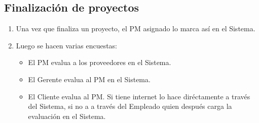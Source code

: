 \subsection{Finalización de proyectos}
\begin{enumerate}
    \item Una vez que finaliza un proyecto, el PM asignado lo marca así en el Sistema.
    \item Luego se hacen varias encuestas:
        \begin{itemize}
            \item El PM evalua a los proveedores en el Sistema.
            \item El Gerente evalua al PM en el Sistema.
            \item El Cliente evalua al PM. Si tiene internet lo hace diréctamente a través del Sistema, si no a a través del Empleado quien después carga la evaluación en el Sistema.
        \end{itemize}
\end{enumerate}
